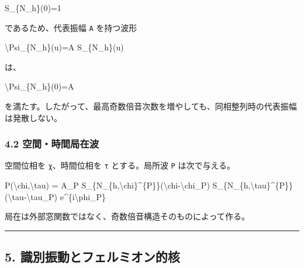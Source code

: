 \documentclass[
  a4paper,
]{article}
\newenvironment{Shaded}{}{}
\newcommand{\NormalTok}[1]{#1}
\begin{document}
\begin{Shaded}
\begin{Highlighting}[]
\NormalTok{S\_\{N\_h\}(0)=1}
\end{Highlighting}
\end{Shaded}

であるため、代表振幅 \texttt{A} を持つ波形

\begin{Shaded}
\begin{Highlighting}[]
\NormalTok{\textbackslash{}Psi\_\{N\_h\}(u)=A S\_\{N\_h\}(u)}
\end{Highlighting}
\end{Shaded}

は、

\begin{Shaded}
\begin{Highlighting}[]
\NormalTok{\textbackslash{}Psi\_\{N\_h\}(0)=A}
\end{Highlighting}
\end{Shaded}

を満たす。したがって、最高奇数倍音次数を増やしても、同相整列時の代表振幅は発散しない。

\subsubsection{4.2
空間・時間局在波}\label{ux7a7aux9593ux6642ux9593ux5c40ux5728ux6ce2}

空間位相を \texttt{χ}、時間位相を \texttt{τ} とする。局所波 \texttt{P}
は次で与える。

\begin{Shaded}
\begin{Highlighting}[]
\NormalTok{P(\textbackslash{}chi,\textbackslash{}tau)}
\NormalTok{=}
\NormalTok{A\_P}
\NormalTok{S\_\{N\_\{h,\textbackslash{}chi\}\^{}\{P\}\}(\textbackslash{}chi{-}\textbackslash{}chi\_P)}
\NormalTok{S\_\{N\_\{h,\textbackslash{}tau\}\^{}\{P\}\}(\textbackslash{}tau{-}\textbackslash{}tau\_P)}
\NormalTok{e\^{}\{i\textbackslash{}phi\_P\}}
\end{Highlighting}
\end{Shaded}

局在は外部窓関数ではなく、奇数倍音構造そのものによって作る。

\begin{center}\rule{0.5\linewidth}{0.5pt}\end{center}

\subsection{5.
識別振動とフェルミオン的核}\label{ux8b58ux5225ux632fux52d5ux3068ux30d5ux30a7ux30ebux30dfux30aaux30f3ux7684ux6838}
\end{document}
